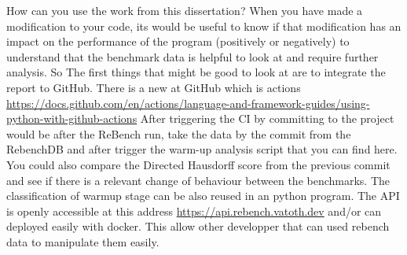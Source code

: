 \documentclass{article}
\begin{document}
How can you use the work from this dissertation?
When you have made a modification to your code, its would be useful to know if that modification has an impact on the performance of the program (positively or negatively) to understand that the benchmark data is helpful to look at and require further analysis. So The first things that might be good to look at are to integrate the report to GitHub. There is a new  at GitHub which is  actions \url{https://docs.github.com/en/actions/language-and-framework-guides/using-python-with-github-actions}
After triggering the CI by committing to the project would be after the ReBench run, take the data by the commit from the RebenchDB and after trigger the warm-up analysis script that you can find here.
You could also compare the Directed Hausdorff score from the previous commit and see if there is a relevant change of behaviour between the benchmarks.  The classification of warmup stage can be also reused in an python program.
The API is openly accessible at this address \url{https://api.rebench.vatoth.dev} and/or can deployed easily with docker. This allow other developper that can used rebench data to manipulate them easily.


\end{document}
